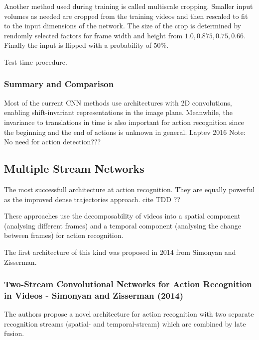 Another method used during training is called multiscale cropping.
Smaller input volumes as needed are cropped from the training videos and then rescaled to fit to the input dimensions of the network.
The size of the crop is determined by rendomly selected factors for frame width and height from ${1.0, 0.875, 0.75, 0.66}$.
Finally the input is flipped with a probability of 50\%.

Test time procedure.





\subsubsection{Summary and Comparison}
Most of the current CNN methods use architectures with 2D convolutions, enabling shift-invariant representations in the image plane. Meanwhile, the invariance to translations in time is also important for action recognition since the beginning and the end of actions is unknown in general. Laptev 2016
Note: No need for action detection???

\newpage
\subsection{Multiple Stream Networks}
The most successfull architecture at action recognition. They are equally powerful as the improved dense trajectories approach. cite TDD ??

These approaches use the decomposability of videos into a spatial component (analysing different frames) and a temporal component (analysing the change between frames) for action recognition.

The first architecture of this kind was proposed in 2014 from Simonyan and Zisserman.

\subsubsection{Two-Stream Convolutional Networks for Action Recognition in Videos - Simonyan and Zisserman (2014)}

The authors propose a novel architecture for action recognition with two separate recognition streams (spatial- and temporal-stream) which are combined by late fusion.


